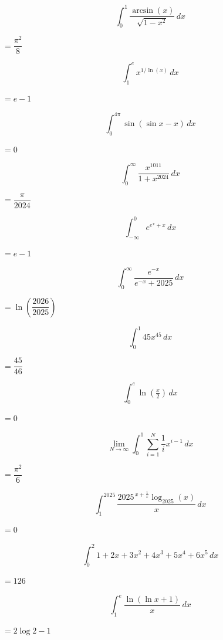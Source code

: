 \begin{questions}
\question \[ \int_0^1 \frac{\arcsin(x)}{\sqrt{1-x^2}}\, dx \]
\begin{solution} $= \dfrac{\pi^2}{8}$ \end{solution}

\question \[ \int_1^e x^{1/\ln(x)}\, dx \]
\begin{solution} $= e-1$ \end{solution}

\question \[ \int_0^{4\pi} \sin(\sin x - x)\, dx \]
\begin{solution} $= 0$ \end{solution}

\question \[ \int_0^\infty \frac{x^{1011}}{1+x^{2024}}\, dx \]
\begin{solution} $= \dfrac{\pi}{2024}$ \end{solution}

\question \[ \int_{-\infty}^0 e^{e^x+x}\, dx \]
\begin{solution} $= e-1$ \end{solution}

\question \[ \int_0^\infty \frac{e^{-x}}{e^{-x}+2025}\, dx \]
\begin{solution} $= \ln\left(\dfrac{2026}{2025}\right)$ \end{solution}

\question \[ \int_0^1 45x^{45}\, dx \]
\begin{solution} $= \dfrac{45}{46}$ \end{solution}

\question \[ \int_0^e \ln\left(\tfrac{x}{2}\right)\, dx \]
\begin{solution} $= 0$ \end{solution}

\question \[ \lim_{N\to\infty} \int_0^1 \sum_{i=1}^N \frac{1}{i}x^{i-1}\, dx \]
\begin{solution} $= \dfrac{\pi^2}{6}$ \end{solution}

\question \[ \int_1^{2025} \frac{2025^{\,x+\frac{1}{x}}\log_{2025}(x)}{x}\, dx \]
\begin{solution} $= 0$ \end{solution}

\question \[ \int_0^2 1+2x+3x^2+4x^3+5x^4+6x^5\, dx \]
\begin{solution} $= 126$ \end{solution}

\question \[ \int_1^e \frac{\ln(\ln x+1)}{x}\, dx \]
\begin{solution} $= 2\log 2 - 1$ \end{solution}


\end{questions}
